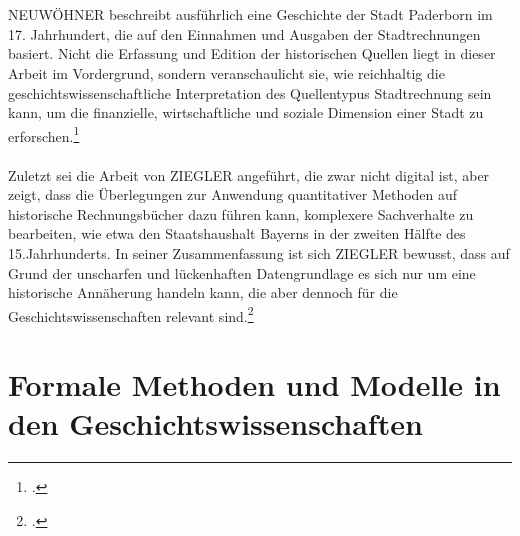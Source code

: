 \documentclass[12pt,a4paper]{article}
\begin{document}
\\
\\
NEUWÖHNER beschreibt ausführlich eine Geschichte der Stadt Paderborn im 17. Jahrhundert, die auf den Einnahmen und Ausgaben der Stadtrechnungen basiert. Nicht die Erfassung und Edition der historischen Quellen liegt in dieser Arbeit im Vordergrund, sondern veranschaulicht sie, wie reichhaltig die geschichtswissenschaftliche Interpretation des Quellentypus Stadtrechnung sein kann, um die finanzielle, wirtschaftliche und soziale Dimension einer Stadt zu erforschen.\footcite[][S.11-50]{neuwohner2016rechnen}  
\\
\\
Zuletzt sei die Arbeit von ZIEGLER angeführt, die zwar nicht digital ist, aber zeigt, dass die Überlegungen zur Anwendung quantitativer Methoden auf historische Rechnungsbücher dazu führen kann, komplexere Sachverhalte zu bearbeiten, wie etwa den Staatshaushalt Bayerns in der zweiten Hälfte des 15.Jahrhunderts. In seiner Zusammenfassung ist sich ZIEGLER bewusst, dass auf Grund der unscharfen und lückenhaften Datengrundlage es sich nur um eine historische Annäherung handeln kann, die aber dennoch für die Geschichtswissenschaften relevant sind.\footcite[][S.221-230]{ziegler1981Staatshaushalt}

\newpage
\section{Formale Methoden und Modelle in den Geschichtswissenschaften}
\end{document}
